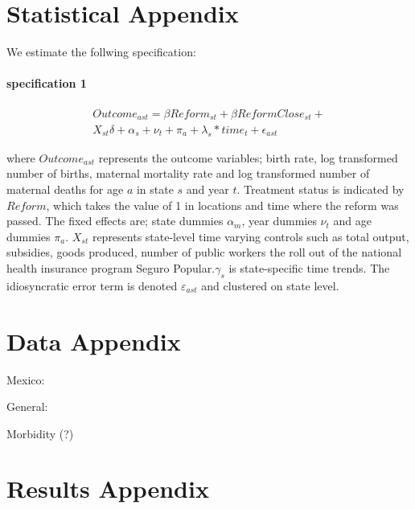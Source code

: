 \documentclass[a4paper, 11pt]{article}
\begin{document}
 
 \newpage
 \singlespacing
 
 
 
 \newpage
\begin{appendices}
\section{Statistical Appendix}
 	We estimate the follwing specification:
 	\paragraph{specification 1}
 	
 	
 	\begin{eqnarray*}\label{eq1}
 		{Outcome_{ast}= \beta Reform_{st} +\beta ReformClose_{st}+} \\  
 		{	X_{st}\delta +\alpha_{s} + \nu_{t} +\pi_{a}+ \lambda_{s}*time_{t} +\epsilon_{ast}}   
 	\end{eqnarray*}
 	
 	\noindent where $Outcome_{ast}$ represents the outcome variables; birth rate, log transformed number of births, maternal mortality rate and log transformed number of maternal deaths for age $a$ in state $s$ and year $t$. Treatment status is indicated by $Reform$, which takes the value of 1 in locations and time where the reform was passed. The fixed effects are; state dummies $\alpha_{m}$, year dummies  $\nu_{t}$ and age dummies $\pi_{a}$. $X_{st}$ represents state-level time varying controls such as total output, subsidies, goods produced, number of public workers the roll out of the national health insurance program Seguro Popular.$\gamma_{s}$ is state-specific time trends. The idiosyncratic error term is denoted $\varepsilon_{ast}$ and clustered on state  level.

\section{Data Appendix}
Mexico: \citet{Aguirre1997,Walkeretal2004,Schiavonetal2012}

General:

Morbidity (?) \citet{Adleretal2012}

\section{Results Appendix}
 	

\end{appendices}
\end{document}

